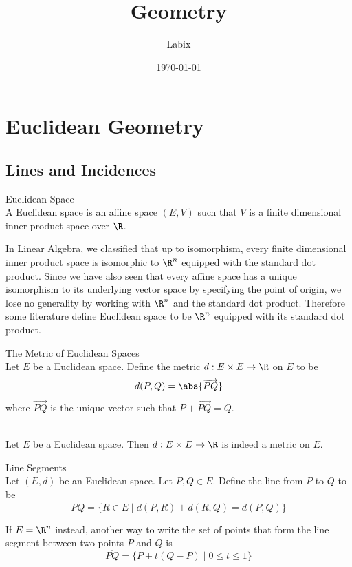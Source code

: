 \documentclass[a4paper]{article}
\title{Geometry}
\author{Labix}
\date{\today}
\begin{document}
\maketitle

\pagebreak
\tableofcontents

\pagebreak
\section{Euclidean Geometry}
\subsection{Lines and Incidences}
\begin{defn}{Euclidean Space}{}\\
A Euclidean space is an affine space $(E,V)$ such that $V$ is a finite dimensional inner product space over $\R$. 
\end{defn}

In Linear Algebra, we classified that up to isomorphism, every finite dimensional inner product space is isomorphic to $\R^n$ equipped with the standard dot product. Since we have also seen that every affine space has a unique isomorphism to its underlying vector space by specifying the point of origin, we lose no generality by working with $\R^n$ and the standard dot product. Therefore some literature define Euclidean space to be $\R^n$ equipped with its standard dot product. 

\begin{defn}{The Metric of Euclidean Spaces}{}\\
Let $E$ be a Euclidean space. Define the metric $d:E\times E\to\R$ on $E$ to be $$d(P,Q)=\abs{\overrightarrow{PQ}}$$ where $\overrightarrow{PQ}$ is the unique vector such that $P+\overrightarrow{PQ}=Q$. 
\end{defn}

\begin{lmm}{}{}\\
Let $E$ be a Euclidean space. Then $d:E\times E\to\R$ is indeed a metric on $E$. 
\end{lmm}

\begin{defn}{Line Segments}{}\\
Let $(E,d)$ be an Euclidean space. Let $P,Q\in E$. Define the line from $P$ to $Q$ to be $$\overline{PQ}=\{R\in E\;|\;d(P,R)+d(R,Q)=d(P,Q)\}$$
\end{defn}

If $E=\R^n$ instead, another way to write the set of points that form the line segment between two points $P$ and $Q$ is $$\overline{PQ}=\{P+t(Q-P)\;|\;0\leq t\leq 1\}$$
\end{document}
